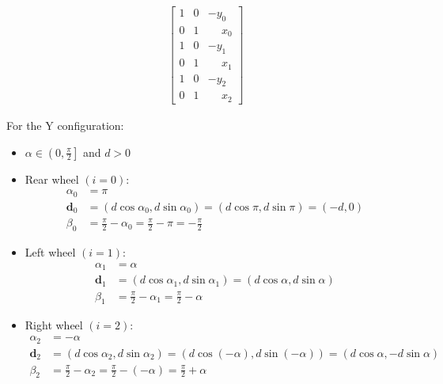 \documentclass[11pt,a4paper]{article}
\newcommand{\vect}[1]{\bm{#1}}       %
\begin{document}
\begin{equation}
\begin{aligned}
\begin{bmatrix}
                                  1 & 0 & -y_0           \\
                                  0 & 1 & \phantom{-}x_0 \\
                                  1 & 0 & -y_1           \\
                                  0 & 1 & \phantom{-}x_1 \\
                                  1 & 0 & -y_2           \\
                                  0 & 1 & \phantom{-}x_2
                              \end{bmatrix}
    \end{aligned}
\end{equation}

For the Y configuration:

\begin{itemize}
    \item \(\alpha \in \left(0, \frac{\pi}{2}\right]\) and \(d > 0\)
    \item Rear wheel \((i = 0)\):
          \[
              \begin{aligned}
                  \alpha_0   & = \pi                                                             \\
                  \vect{d}_0 & = (d\cos\alpha_0, d\sin\alpha_0) = (d\cos\pi, d\sin\pi) = (-d, 0) \\
                  \beta_0    & = \frac{\pi}{2} - \alpha_0 = \frac{\pi}{2} - \pi = -\frac{\pi}{2}
              \end{aligned}
          \]
    \item Left wheel \((i = 1)\):
          \[
              \begin{aligned}
                  \alpha_1   & = \alpha                                                      \\
                  \vect{d}_1 & = (d\cos\alpha_1, d\sin\alpha_1) = (d\cos\alpha, d\sin\alpha) \\
                  \beta_1    & = \frac{\pi}{2} - \alpha_1 = \frac{\pi}{2} - \alpha
              \end{aligned}
          \]
    \item Right wheel \((i = 2)\):
          \[
              \begin{aligned}
                  \alpha_2   & = -\alpha                                                                                         \\
                  \vect{d}_2 & = (d\cos\alpha_2, d\sin\alpha_2) = (d\cos(-\alpha), d\sin(-\alpha)) = (d\cos\alpha, -d\sin\alpha) \\
                  \beta_2    & = \frac{\pi}{2} - \alpha_2 = \frac{\pi}{2} - (-\alpha) = \frac{\pi}{2} + \alpha
              \end{aligned}
          \]
\end{itemize}
\end{document}
